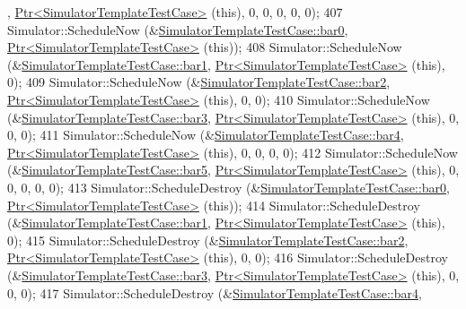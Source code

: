 \begin{DoxyCode}
      , \hyperlink{classns3_1_1Ptr}{Ptr<SimulatorTemplateTestCase>} (\textcolor{keyword}{this}), 0, 0, 0, 0, 0);
407   Simulator::ScheduleNow (&\hyperlink{classSimulatorTemplateTestCase_a7c53480e1b906bfeaea5e0070ff5cc0c}{SimulatorTemplateTestCase::bar0}, 
      \hyperlink{classns3_1_1Ptr}{Ptr<SimulatorTemplateTestCase>} (\textcolor{keyword}{this}));
408   Simulator::ScheduleNow (&\hyperlink{classSimulatorTemplateTestCase_a83631fe15f6b4aaffcf702e71a664205}{SimulatorTemplateTestCase::bar1}, 
      \hyperlink{classns3_1_1Ptr}{Ptr<SimulatorTemplateTestCase>} (\textcolor{keyword}{this}), 0);
409   Simulator::ScheduleNow (&\hyperlink{classSimulatorTemplateTestCase_a0a416b76615bb0e90f1312694f09133b}{SimulatorTemplateTestCase::bar2}, 
      \hyperlink{classns3_1_1Ptr}{Ptr<SimulatorTemplateTestCase>} (\textcolor{keyword}{this}), 0, 0);
410   Simulator::ScheduleNow (&\hyperlink{classSimulatorTemplateTestCase_aea52cc1b6dabac3782131bc96f7e3556}{SimulatorTemplateTestCase::bar3}, 
      \hyperlink{classns3_1_1Ptr}{Ptr<SimulatorTemplateTestCase>} (\textcolor{keyword}{this}), 0, 0, 0);
411   Simulator::ScheduleNow (&\hyperlink{classSimulatorTemplateTestCase_a0a46a38ced46c32a980d1458f23f26ac}{SimulatorTemplateTestCase::bar4}, 
      \hyperlink{classns3_1_1Ptr}{Ptr<SimulatorTemplateTestCase>} (\textcolor{keyword}{this}), 0, 0, 0, 0);
412   Simulator::ScheduleNow (&\hyperlink{classSimulatorTemplateTestCase_a75066b2e82301377dddc07d887c96853}{SimulatorTemplateTestCase::bar5}, 
      \hyperlink{classns3_1_1Ptr}{Ptr<SimulatorTemplateTestCase>} (\textcolor{keyword}{this}), 0, 0, 0, 0, 0);
413   Simulator::ScheduleDestroy (&\hyperlink{classSimulatorTemplateTestCase_a7c53480e1b906bfeaea5e0070ff5cc0c}{SimulatorTemplateTestCase::bar0}, 
      \hyperlink{classns3_1_1Ptr}{Ptr<SimulatorTemplateTestCase>} (\textcolor{keyword}{this}));
414   Simulator::ScheduleDestroy (&\hyperlink{classSimulatorTemplateTestCase_a83631fe15f6b4aaffcf702e71a664205}{SimulatorTemplateTestCase::bar1}, 
      \hyperlink{classns3_1_1Ptr}{Ptr<SimulatorTemplateTestCase>} (\textcolor{keyword}{this}), 0);
415   Simulator::ScheduleDestroy (&\hyperlink{classSimulatorTemplateTestCase_a0a416b76615bb0e90f1312694f09133b}{SimulatorTemplateTestCase::bar2}, 
      \hyperlink{classns3_1_1Ptr}{Ptr<SimulatorTemplateTestCase>} (\textcolor{keyword}{this}), 0, 0);
416   Simulator::ScheduleDestroy (&\hyperlink{classSimulatorTemplateTestCase_aea52cc1b6dabac3782131bc96f7e3556}{SimulatorTemplateTestCase::bar3}, 
      \hyperlink{classns3_1_1Ptr}{Ptr<SimulatorTemplateTestCase>} (\textcolor{keyword}{this}), 0, 0, 0);
417   Simulator::ScheduleDestroy (&\hyperlink{classSimulatorTemplateTestCase_a0a46a38ced46c32a980d1458f23f26ac}{SimulatorTemplateTestCase::bar4}, 

\end{DoxyCode}
